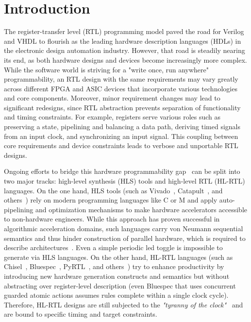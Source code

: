 \section{Introduction}
The register-transfer level (RTL) programming model paved the road for Verilog and VHDL to flourish as the leading hardware description languages (HDLs) in the electronic design automation industry. However, that road is steadily nearing its end, as both hardware designs and devices become increasingly more complex. While the software world is striving for a "write once, run anywhere" programmability, an RTL design with the same requirements may vary greatly across different FPGA and ASIC devices that incorporate various technologies and core components. Moreover, minor requirement changes may lead to significant redesigns, since RTL abstraction prevents separation of functionality and timing constraints. For example, registers serve various roles such as preserving a state, pipelining and balancing a data path, deriving timed signals from an input clock, and synchronizing an input signal. This coupling between core requirements and device constraints leads to verbose and unportable RTL designs. 

Ongoing efforts to bridge this hardware programmability gap~\cite{Kapre2016, Nane2016, Windh2015} can be split into two major tracks: high-level synthesis (HLS) tools and high-level RTL (HL-RTL) languages.
On the one hand, HLS tools (such as Vivado~\cite{Vivado2012}, Catapult~\cite{graphics2008catapult}, and others~\cite{Kavvadias2013, synphony2015}) rely on modern programming languages like C or M and apply  auto-pipelining and optimization mechanisms to make hardware accelerators accessible to non-hardware engineers. While this approach has proven successful in algorithmic acceleration domains, such languages carry von Neumann sequential semantics and thus hinder construction of parallel hardware, which is required to describe architectures~\cite{Zhao2017}. Even a simple periodic led toggle is impossible to generate via HLS languages.
On the other hand, HL-RTL languages (such as Chisel~\cite{Bachrach2012}, Bluespec~\cite{nikhil2004bluespec}, PyRTL~\cite{Clow2017}, and others~\cite{Charles2016, Liu2017, jiang2018mamba, decaluwe2004myhdl, CxLang2014, Lockhart2014}) try to enhance productivity by introducing new hardware generation constructs and semantics but without abstracting over register-level description (even Bluespec that uses concurrent guarded atomic actions assumes rules complete within a single clock cycle). Therefore, HL-RTL designs are still subjected to the \emph{"tyranny of the clock"}~\cite{Sutherland2012} and are bound to specific timing and target constraints.

